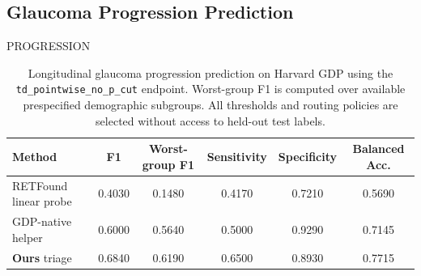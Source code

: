 \subsection{Glaucoma Progression Prediction}
PROGRESSION 
\begin{table}[t]
\centering
\caption{Longitudinal glaucoma progression prediction on Harvard GDP using the
\texttt{td\_pointwise\_no\_p\_cut} endpoint. Worst-group F1 is computed over
available prespecified demographic subgroups. All thresholds and routing
policies are selected without access to held-out test labels.}
\label{tab:gdp_progression_prediction}
\begin{tabular}{@{}lccccc@{}}
\toprule
\textbf{Method}  & \textbf{F1} &
\textbf{Worst-group F1} & \textbf{Sensitivity} &
\textbf{Specificity} & \textbf{Balanced Acc.} \\
\midrule
RETFound linear probe & 0.4030 & 0.1480 & 0.4170 & 0.7210 & 0.5690 \\
GDP-native helper & 0.6000 & 0.5640 & 0.5000 & 0.9290 & 0.7145 \\
\textbf{Ours} triage & 0.6840 & 0.6190 & 0.6500 & 0.8930 & 0.7715 \\
\bottomrule
\end{tabular}
\end{table}

